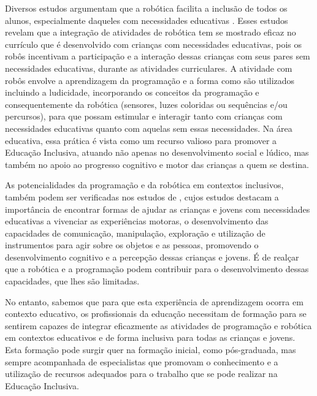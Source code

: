 \documentclass[portuguese]{textolivre}
\begin{document}
Diversos estudos argumentam que a robótica facilita a inclusão de todos os alunos, especialmente daqueles com necessidades educativas \cite{casaca_crescer_2018,conchinha_playful_2015,loureiro_educational_2023,lourenco_utilizacao_2019,marcao_robots_2017}. Esses estudos revelam que a integração de atividades de robótica tem se mostrado eficaz no currículo que é desenvolvido com crianças com necessidades educativas, pois os robôs incentivam a participação e a interação dessas crianças com seus pares sem necessidades educativas, durante as atividades curriculares. A atividade com robôs envolve a aprendizagem da programação e a forma como são utilizados incluindo a ludicidade, incorporando os conceitos da programação e consequentemente da robótica (sensores, luzes coloridas ou sequências e/ou percursos), para que possam estimular e interagir tanto com crianças com necessidades educativas quanto com aquelas sem essas necessidades. Na área educativa, essa prática é vista como um recurso valioso para promover a Educação Inclusiva, atuando não apenas no desenvolvimento social e lúdico, mas também no apoio ao progresso cognitivo e motor das crianças a quem se destina.

As potencialidades da programação e da robótica em contextos inclusivos, também podem ser verificadas nos estudos de \textcite{adams_k.;_alvarez_l.;_rios_a.;_encarnacao_p.;_cook_a._big_2012,ferm_participation_2015,gonzalez_gonzalez_estrategias_2019,sheehy_beaming_2011}, cujos estudos destacam a importância de encontrar formas de ajudar as crianças e jovens com necessidades educativas a vivenciar as experiências motoras, o desenvolvimento das capacidades de comunicação, manipulação, exploração e utilização de instrumentos para agir sobre os objetos e as pessoas, promovendo o desenvolvimento cognitivo e a percepção dessas crianças e jovens. É de realçar que a robótica e a programação podem contribuir para o desenvolvimento dessas capacidades, que lhes são limitadas.

No entanto, sabemos que para que esta experiência de aprendizagem ocorra em contexto educativo, os profissionais da educação necessitam de formação para se sentirem capazes de integrar eficazmente as atividades de programação e robótica em contextos educativos e de forma inclusiva para todas as crianças e jovens. Esta formação pode surgir quer na formação inicial, como pós-graduada, mas sempre acompanhada de especialistas que promovam o conhecimento e a utilização de recursos adequados para o trabalho que se pode realizar na Educação Inclusiva.
\end{document}
